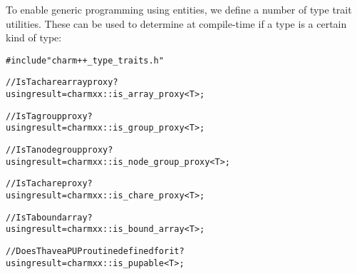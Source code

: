 To enable generic programming using \charmpp entities, we define a number of type trait
utilities. These can be used to determine at compile-time if a type is a certain kind
of \charmpp type:
\begin{alltt}
#include "charm++_type_traits.h"

// Is T a chare array proxy?
using result = charmxx::is_array_proxy<T>;

// Is T a group proxy?
using result = charmxx::is_group_proxy<T>;

// Is T a node group proxy?
using result = charmxx::is_node_group_proxy<T>;

// Is T a chare proxy?
using result = charmxx::is_chare_proxy<T>;

// Is T a bound array?
using result = charmxx::is_bound_array<T>;

// Does T have a PUP routine defined for it?
using result = charmxx::is_pupable<T>;
\end{alltt}


